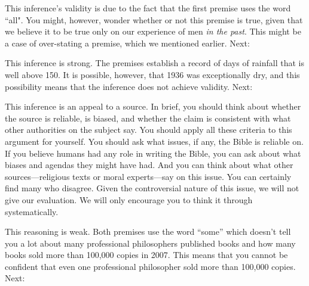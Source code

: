 This inference's validity is due to the fact that the first premise uses the word ``all". You might, however, wonder whether or not this premise is true, given that we believe it to be true only on our experience of men \textit{in the past}. This might be a case of over-stating a premise, which we mentioned earlier. Next:

\begin{kormanize}
\end{kormanize}

This inference is strong. The premises establish a record of days of rainfall that is well above 150. It is possible, however, that 1936 was exceptionally dry, and this possibility means that the inference does not achieve validity. Next:

\begin{kormanize}
\end{kormanize}

This inference is an appeal to a source.  In brief, you should think about whether the source is reliable, is biased, and whether the claim is consistent with what other authorities on the subject say. You should apply all these criteria to this argument for yourself. You should ask what issues, if any, the Bible is reliable on. If you believe humans had any role in writing the Bible, you can ask about what biases and agendas they might have had. And you can think about what other sources---religious texts or moral experts---say on this issue. You can certainly find many who disagree. Given the controversial nature of this issue, we will not give our evaluation. We will only encourage you to think it through systematically.


\begin{kormanize}
\end{kormanize}

This reasoning is weak. Both premises use the word ``some'' which doesn't tell you a lot about many professional philosophers published books and how many books sold more than 100,000 copies in 2007. This means that you cannot be confident that even one professional philosopher sold more than 100,000 copies. Next:

